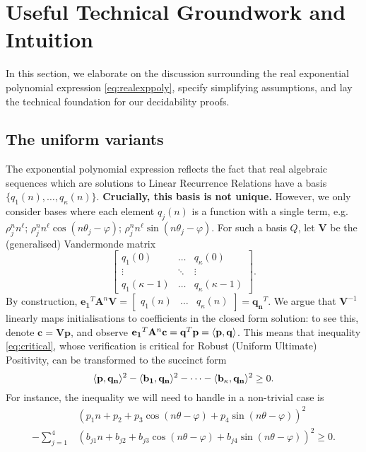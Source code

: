 \section{Useful Technical Groundwork and Intuition}
\label{section:utils}
In this section, we elaborate on the discussion surrounding the real exponential polynomial expression \ref{eq:realexppoly}, specify simplifying assumptions, and lay the technical foundation for our decidability proofs. 


\subsection{The uniform variants}
The exponential polynomial expression reflects the fact that real algebraic sequences which are solutions to Linear Recurrence Relations have a basis $\{q_1(n), \dots, q_\kappa(n)\}$. \textbf{Crucially, this basis is not unique.} However, we only consider bases where each element $q_j(n)$ is a function with a single term, e.g. $\rho_j^n n^\ell$; $\rho_j^n n^\ell \cos(n\theta_j - \varphi)$; $\rho_j^n n^\ell \sin(n\theta_j - \varphi)$. For such a basis $Q$, let $\mathbf{V}$ be the (generalised) Vandermonde matrix
\begin{equation*}
\begin{bmatrix}
q_1(0) & \dots & q_\kappa(0) \\
\vdots & \ddots & \vdots \\
q_1(\kappa-1) & \dots & q_{\kappa}(\kappa-1)
\end{bmatrix}.
\end{equation*}
By construction, $\mathbf{e_1}^T\mathbf{A}^n\mathbf{V} = \begin{bmatrix}q_1(n) & \dots & q_\kappa(n)\end{bmatrix} = \mathbf{q_n}^T$. We argue that $\mathbf{V}^{-1}$ linearly maps initialisations to coefficients in the closed form solution: to see this, denote $\mathbf{c} = \mathbf{Vp}$, and observe $\mathbf{e_1}^T\mathbf{A}^n\mathbf{c} = \mathbf{q}^T\mathbf{p} = \langle\mathbf{p}, \mathbf{q}\rangle$. This means that inequality \ref{eq:critical}, whose verification is critical for Robust (Uniform Ultimate) Positivity, can be transformed to the succinct form
\begin{equation}
\langle\mathbf{p}, \mathbf{q_n}\rangle^2 - \langle\mathbf{b_1}, \mathbf{q_n}\rangle^2 - \dots - \langle\mathbf{b_\kappa}, \mathbf{q_n}\rangle^2 \ge 0.
\end{equation}
For instance, the inequality we will need to handle in a non-trivial case is
\begin{align*}
&(p_1n + p_2 + p_3\cos(n\theta -\varphi) + p_4\sin(n\theta-\varphi))^2 \\- \sum_{j=1}^4 &(b_{j1}n + b_{j2} + b_{j3}\cos(n\theta -\varphi) + b_{j4}\sin(n\theta-\varphi))^2 \ge 0.
\end{align*}
